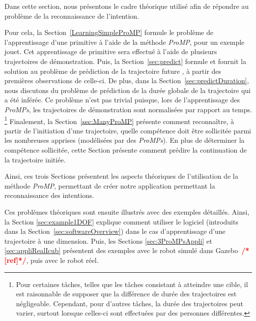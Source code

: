 \documentclass[utf8]{frontiersSCNS} %
\newcommand{\toimprove}[1]{\textcolor{teal}{#1}}
\newcommand{\todo}[1]{\textcolor{red}{\textbf{/*#1*/}}}
\begin{document}
Dans cette section, nous présentons le cadre théorique utilisé afin de répondre au problème de la reconnaissance de l'intention. 


Pour cela, la Section~\ref{LearningSimpleProMP} formule le problème de l'apprentissage d'une primitive à l'aide de la méthode \textit{ProMP}, pour un exemple jouet. Cet apprentissage de primitive sera effectué à l'aide de plusieurs trajectoires de démonstration. 
Puis, la Section~\ref{sec:predict} formule et fournit la solution au problème de prédiction de la trajectoire \og future \fg{}, à partir des premières observations de celle-ci.
De plus, dans la Section~\ref{sec:predictDuration}, nous discutons du problème de prédiction de la 
durée globale de la trajectoire qui a été inférée. Ce problème n'est pas trivial puisque, lors de l'apprentissage des \textit{ProMPs}, les trajectoires de démonstration sont \og normalisées \fg{} par rapport au temps. \footnote{Pour certaines tâches, telles que les tâches consistant à atteindre une cible, il est raisonnable de supposer que la différence de durée des trajectoires est négligeable. Cependant, pour d'autres tâches, la durée des trajectoires peut varier, surtout lorsque celles-ci sont effectuées par des personnes différentes.}
Finalement, la Section~\ref{sec:ManyProMP} présente comment reconnaître, à partir de l'initiation d'une trajectoire, quelle compétence doit être sollicitée parmi les nombreuses apprises (modélisées par des \textit{ProMPs}). En plus de déterminer la compétence sollicitée, cette Section présente comment prédire la continuation de la trajectoire initiée.

Ainsi, ces trois Sections présentent les aspects théoriques de l'utilisation de la méthode \textit{ProMP}, permettant de créer notre application permettant la reconnaissance des intentions.

Ces problèmes théoriques sont ensuite illustrés avec des exemples détaillés.
Ainsi, la Section \ref{sec:example1DOF} explique comment utiliser le logiciel (introduits dans la Section~\ref{sec:softwareOverview}) dans le cas d'apprentissage d'une trajectoire à une dimension.
Puis, les Sections \ref{sec:3ProMPsAppli} et \ref{sec:appliRealIcub} présentent des exemples avec le robot simulé dans Gazebo~\todo{[ref]}, puis avec le robot réel.
\end{document}
